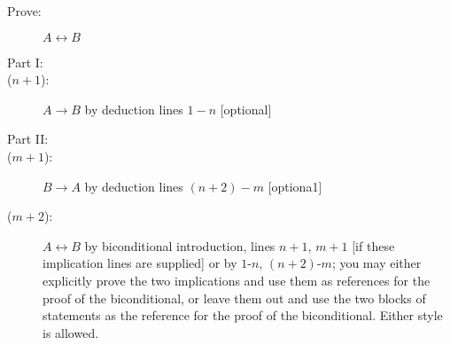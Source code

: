 \documentclass[12pt]{article}
\begin{document}
\begin{description}

\item[Prove:]  $A \leftrightarrow B$

\item[Part I:]


\item[($n+1$):]  $A \rightarrow B$ by deduction lines $1-n$  [optional]



\item[Part II:]


\item[($m+1$):]  $B \rightarrow A$ by deduction lines $(n+2)-m$ [optiona1]

\item[($m+2$):]  $A \leftrightarrow B$ by biconditional introduction, lines $n+1$, $m+1$ [if these implication lines are supplied] or by $1$-$n$, $(n+2)$-$m$; you may either explicitly prove the two implications and use them as references for the proof of the biconditional, or leave them out and use the two blocks of statements as the reference for the proof of the biconditional.  Either style is allowed.

\end{description}
\end{document}
